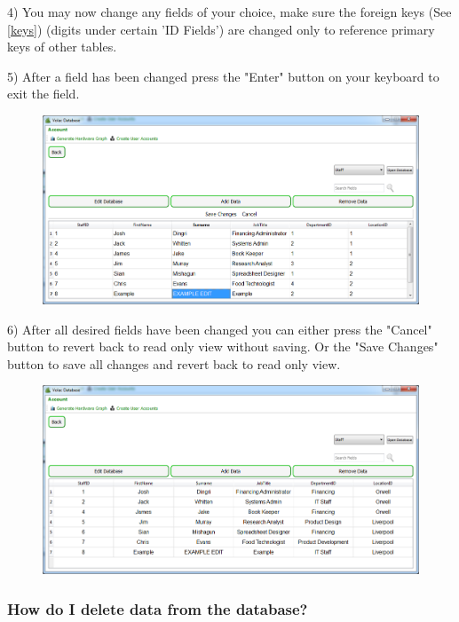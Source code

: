 4) You may now change any fields of your choice, make sure the foreign keys (See \ref{keys}) (digits under certain 'ID Fields') are changed only to reference primary keys of other tables.

5) After a field has been changed press the "Enter" button on your keyboard to exit the field.

\begin{figure}[H]
    \includegraphics[width=\textwidth]{./Manual/Images/editdata2.png}
\end{figure}

6) After all desired fields have been changed you can either press the "Cancel" button to revert back to read only view without saving. Or the "Save Changes" button to save all changes and revert back to read only view.

\begin{figure}[H]
    \includegraphics[width=\textwidth]{./Manual/Images/editdata3.png}
\end{figure}

\subsubsection{How do I delete data from the database?}

